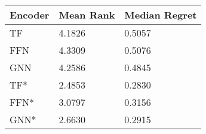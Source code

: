 \begin{tabular}{lll}
\toprule
Encoder & Mean Rank & Median Regret \\
\midrule
TF & 4.1826 & 0.5057 \\
FFN & 4.3309 & 0.5076 \\
GNN & 4.2586 & 0.4845 \\
TF* & 2.4853 & 0.2830 \\
FFN* & 3.0797 & 0.3156 \\
GNN* & 2.6630 & 0.2915 \\
\bottomrule
\end{tabular}
